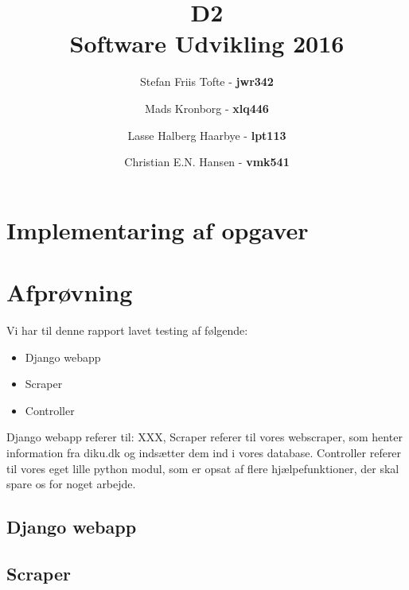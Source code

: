 \documentclass[11pt]{article}
\title{
  \vspace{3cm}
  \Huge{D2} \\
  \Large{Software Udvikling 2016}
}
\author{
	\Large{Stefan Friis Tofte} - \textbf{jwr342}%
	\and
	\Large{Mads Kronborg} - \textbf{xlq446}%
	\and
	\Large{Lasse Halberg Haarbye} - \textbf{lpt113}%
	\and
	\Large{Christian E.N. Hansen} - \textbf{vmk541}%
}
\def \ColourPDF {../include/ku-farve}
\def \TitlePDF {../include/ku-en}  %
\begin{document}


\clearpage\maketitle
\thispagestyle{empty}

\newpage
\tableofcontents
\newpage

\section{Implementaring af opgaver}
\section{Afprøvning}
Vi har til denne rapport lavet testing af følgende: \\
\begin{itemize}
\item Django webapp
\item Scraper
\item Controller
\end{itemize}
Django webapp referer til: XXX, Scraper referer til vores webscraper, som henter information fra diku.dk og indsætter dem ind i vores database. Controller referer til vores eget lille python modul, som er opsat af flere hjælpefunktioner, der skal spare os for noget arbejde.
\subsection{Django webapp}
\subsection{Scraper}
\end{document}
